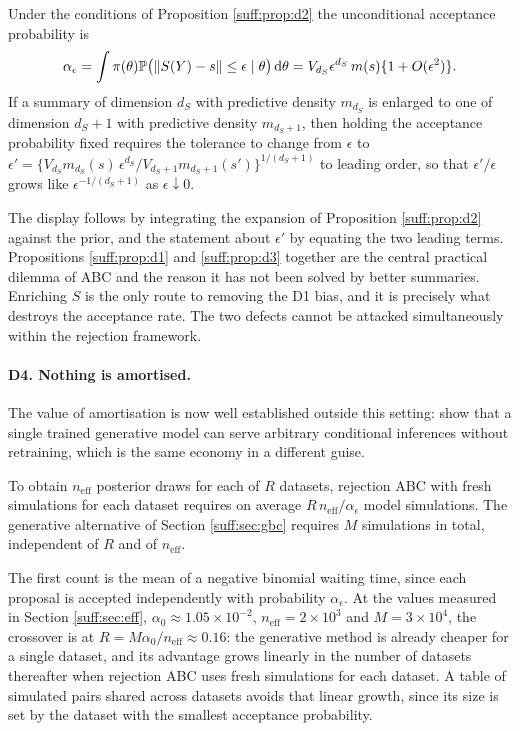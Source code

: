 \begin{proposition}
\label{suff:prop:d3}
Under the conditions of Proposition \ref{suff:prop:d2} the unconditional acceptance
probability is
\[
\alpha_\epsilon=\int\pi(\theta)\mathbb{P}\big(\|S(Y)-s\|\le\epsilon\mid\theta\big)\,\mathrm{d}\theta
= V_{d_S}\epsilon^{d_S}\,m(s)\{1+O(\epsilon^2)\}.
\]
If a summary of dimension $d_S$ with predictive density $m_{d_S}$ is enlarged to one of
dimension $d_S+1$ with predictive density $m_{d_S+1}$, then holding the acceptance
probability fixed requires the tolerance to change from $\epsilon$ to
$\epsilon'=\{V_{d_S}m_{d_S}(s)\,\epsilon^{d_S}/V_{d_S+1}m_{d_S+1}(s')\}^{1/(d_S+1)}$ to
leading order, so that $\epsilon'/\epsilon$ grows like $\epsilon^{-1/(d_S+1)}$ as
$\epsilon\downarrow0$.
\end{proposition}

The display follows by integrating the expansion of Proposition \ref{suff:prop:d2} against
the prior, and the statement about $\epsilon'$ by equating the two leading terms. Propositions
\ref{suff:prop:d1} and \ref{suff:prop:d3} together are the central practical dilemma of ABC
and the reason it has not been solved by better summaries. Enriching $S$ is the only route to
removing the D1 bias, and it is precisely what destroys the acceptance rate. The two defects
cannot be attacked simultaneously within the rejection framework.

\paragraph{D4. Nothing is amortised.} The value of amortisation is now well established
outside this setting: \citet{suff:liuwong2026} show that a single trained generative model
can serve arbitrary conditional inferences without retraining, which is the same economy in a
different guise.

\begin{proposition}
\label{suff:prop:d4}
To obtain $n_{\mathrm{eff}}$ posterior draws for each of $R$ datasets, rejection ABC with fresh simulations for each dataset requires
on average $R\,n_{\mathrm{eff}}/\alpha_\epsilon$ model simulations. The generative alternative
of Section \ref{suff:sec:gbc} requires $M$ simulations in total, independent of $R$ and of
$n_{\mathrm{eff}}$.
\end{proposition}

The first count is the mean of a negative binomial waiting time, since each proposal is
accepted independently with probability $\alpha_\epsilon$. At the values measured in Section
\ref{suff:sec:eff}, $\alpha_0\approx1.05\times10^{-2}$, $n_{\mathrm{eff}}=2\times10^3$ and
$M=3\times10^4$, the crossover is at $R=M\alpha_0/n_{\mathrm{eff}}\approx 0.16$: the
generative method is already cheaper for a single dataset, and its advantage grows linearly
in the number of datasets thereafter when rejection ABC uses fresh simulations for each dataset. A table of simulated pairs shared across datasets avoids that linear growth, since its size is set by the dataset with the smallest acceptance probability.

